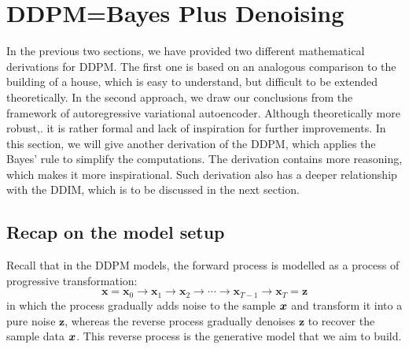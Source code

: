 \section{DDPM=Bayes Plus Denoising}

In the previous two sections, we have provided two different mathematical derivations for DDPM. The first one is based on an analogous comparison to the building of a house, which is easy to understand, but difficult to be extended theoretically. In the second approach, we draw our conclusions from  the framework of autoregressive variational autoencoder. Although theoretically more robust,. it is rather formal and lack of inspiration for  further improvements. In this section, we will give another derivation of the DDPM, which applies the Bayes' rule to simplify the computations. The derivation contains more reasoning,  which makes it more inspirational. Such derivation also has a deeper relationship with the DDIM,\marginnote{\footnotesize{\textcolor{red}{Diffusion Denoising Implicit Model}}} which is to be discussed in the next section.

\subsection{Recap on the model setup}
Recall that in the DDPM models, the forward process is modelled as a process of progressive transformation:
\begin{equation}
    \label{eq:3.1}
    \bm{x}=\bm{x}_0\to\bm{x}_1\to\bm{x}_2\to\cdots\to\bm{x}_{T-1}\to\bm{x}_{T}=\bm{z}
\end{equation}
in which the process gradually adds noise to the sample $\bm{x}$ and transform it into a pure noise $\bm{z}$, whereas the reverse process gradually denoises $\bm{z}$ to recover the sample data $\bm{x}$. This reverse process is the generative model that we aim to build.

